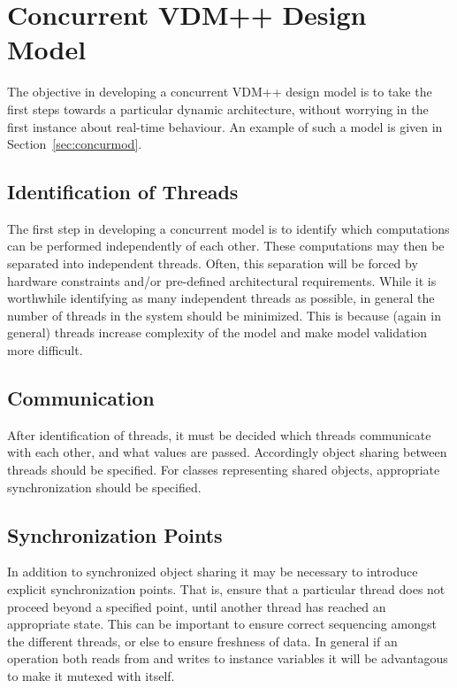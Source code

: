 \documentclass{overturerepchap}
\begin{document}
\section{Concurrent VDM++ Design Model}\label{sec:concur}

The objective in developing a concurrent VDM++ design model is to take
the first steps towards a particular dynamic architecture, without
worrying in the first instance about real-time behaviour. An example
of such a model is given in Section~\ref{sec:concurmod}.

\subsection{Identification of Threads}

The first step in developing a concurrent model is to identify which
computations can be performed independently of each other. These
computations may then be separated into independent threads. Often,
this separation will be forced by hardware constraints and/or
pre-defined architectural requirements. While it is worthwhile
identifying as many independent threads as possible, in general the
number of threads in the system should be minimized. This is because
(again in general) threads increase complexity of the model and make model
validation more difficult.

\subsection{Communication}

After identification of threads, it must be decided which threads
communicate with each other, and what values are passed. Accordingly
object sharing between threads should be specified. For classes
representing shared objects, appropriate synchronization should be
specified.

\subsection{Synchronization Points}

In addition to synchronized object sharing it may be necessary to
introduce explicit synchronization points. That is, ensure that a
particular thread does not proceed beyond a specified point, until
another thread has reached an appropriate state. This can be important
to ensure correct sequencing amongst the different threads, or else to
ensure freshness of data. In general if an operation both reads from
and writes to instance variables it will be advantagous to make it
mutexed with itself.
\end{document}
